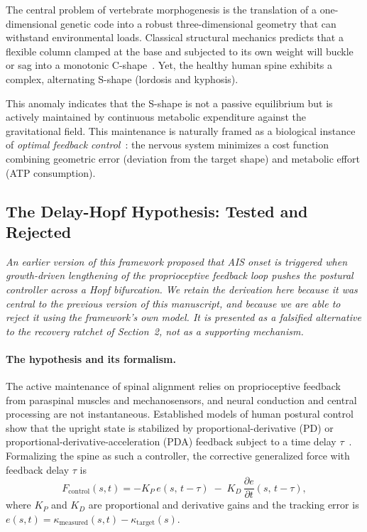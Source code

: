 The central problem of vertebrate morphogenesis is the translation of a one-dimensional genetic code into a robust three-dimensional geometry that can withstand environmental loads. Classical structural mechanics predicts that a flexible column clamped at the base and subjected to its own weight will buckle or sag into a monotonic C-shape~\cite{goriely2017mathematics}. Yet, the healthy human spine exhibits a complex, alternating S-shape (lordosis and kyphosis).

This anomaly indicates that the S-shape is not a passive equilibrium but is actively maintained by continuous metabolic expenditure against the gravitational field. This maintenance is naturally framed as a biological instance of \emph{optimal feedback control}~\cite{todorov2002optimal}: the nervous system minimizes a cost function combining geometric error (deviation from the target shape) and metabolic effort (ATP consumption).

\subsection{The Delay-Hopf Hypothesis: Tested and Rejected}
\label{sec:supp_hopf_rejected}

\textit{An earlier version of this framework proposed that AIS onset is triggered when growth-driven lengthening of the proprioceptive feedback loop pushes the postural controller across a Hopf bifurcation. We retain the derivation here because it was central to the previous version of this manuscript, and because we are able to reject it using the framework's own model. It is presented as a falsified alternative to the recovery ratchet of Section~2, not as a supporting mechanism.}

\paragraph{The hypothesis and its formalism.}
The active maintenance of spinal alignment relies on proprioceptive feedback from paraspinal muscles and mechanosensors, and neural conduction and central processing are not instantaneous. Established models of human postural control show that the upright state is stabilized by proportional-derivative (PD) or proportional-derivative-acceleration (PDA) feedback subject to a time delay $\tau$~\cite{milton2009time, insperger2013acceleration}. Formalizing the spine as such a controller, the corrective generalized force with feedback delay $\tau$ is
\begin{equation}
F_{\mathrm{control}}(s,t) = -K_P\, e(s,\,t-\tau) \;-\; K_D\, \frac{\partial e}{\partial t}(s,\,t-\tau),
\label{eq:control_law_supp}
\end{equation}
where $K_P$ and $K_D$ are proportional and derivative gains and the tracking error is $e(s,t) = \kappa_{\mathrm{measured}}(s,t) - \kappa_{\mathrm{target}}(s)$.

